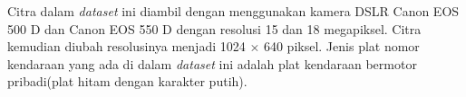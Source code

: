 \noindent Citra dalam \textit{dataset} ini diambil dengan menggunakan kamera DSLR Canon EOS 500 D dan Canon EOS 550 D dengan resolusi 15 dan 18 megapiksel. Citra kemudian diubah resolusinya menjadi 1024 $\times$ 640 piksel. Jenis plat nomor kendaraan yang ada di dalam \textit{dataset} ini adalah plat kendaraan bermotor pribadi(plat hitam dengan karakter putih).





